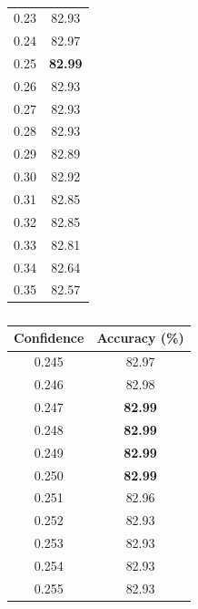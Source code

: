 \documentclass[12pt]{article}
\begin{document}
\begin{table}[H]
\begin{subtable}{.34\linewidth}
\begin{tabular}{c|c}
              0.23  & 82.93 \\
              0.24  & 82.97 \\
              0.25  & \textbf{82.99} \\
              0.26  & 82.93 \\
              0.27  & 82.93 \\
              0.28  & 82.93 \\
              0.29  & 82.89 \\
              0.30  & 82.92 \\
              0.31  & 82.85 \\
              0.32  & 82.85 \\
              0.33  & 82.81 \\
              0.34  & 82.64 \\
              0.35  & 82.57 \\
              \bottomrule
            \end{tabular}
            \label{tab:dt-con-b}
          \end{subtable}%
          \begin{subtable}{.34\linewidth}
            \centering
            \caption{}
            \begin{tabular}{c|c}
              \toprule
              \multicolumn{1}{l|}{Confidence} & \multicolumn{1}{l}{Accuracy (\%)} \\
              \midrule
              0.245 & 82.97 \\
              0.246 & 82.98 \\
              0.247 & \textbf{82.99} \\
              0.248 & \textbf{82.99} \\
              0.249 & \textbf{82.99} \\
              0.250 & \textbf{82.99} \\
              0.251 & 82.96 \\
              0.252 & 82.93 \\
              0.253 & 82.93 \\
              0.254 & 82.93 \\
              0.255 & 82.93 \\
              \bottomrule
            \end{tabular}
          \label{tab:dt-con-c}
          \end{subtable}%
        \label{tab:dt-con}
      \end{table}
      \doublespacing
\end{document}
